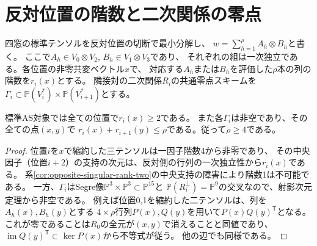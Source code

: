 \section{反対位置の階数と二次関係の零点}
\label{sec:opposite-evaluation}
四窓の標準テンソルを反対位置の切断で最小分解し、
$w=\sum_{h=1}^{\rho} A_h\otimes B_h$と書く。
ここで$A_h\in V_0\otimes V_2$, $B_h\in V_1\otimes V_3$であり、
それぞれの組は一次独立である。各位置の非零共変ベクトル$x$で、
対応する$A_h$または$B_h$を評価した$\rho$本の列の階数を$r_i(x)$とする。
隣接対の二次関係$R_i$の共通零点スキームを
$\Gamma_i\subset\mathbb P(V_i^*)\times\mathbb P(V_{i+1}^*)$とする。

\begin{theorem}[AS対象の第三階数は4以上]\label{thm:opposite-rank-at-least-four}
標準AS対象では全ての位置で$r_i(x)\ge2$である。
また各$\Gamma_i$は非空であり、その全ての点$(x,y)$で
$r_i(x)+r_{i+1}(y)\le\rho$である。従って$\rho\ge4$である。
\end{theorem}
\begin{proof}
位置$i$を$x$で縮約した三テンソルは一因子階数4から非零であり、
その中央因子（位置$i+2$）の支持の次元は、反対側の行列の一次独立性から$r_i(x)$である。
系\ref{cor:opposite-singular-rank-two}の中央支持の障害により階数1は不可能である。
一方、$\Gamma_i$はSegre像$\mathbb P^3\times\mathbb P^3\subset\mathbb P^{15}$と
$\mathbb P(R_i^\perp)=\mathbb P^9$の交叉なので、射影次元定理から非空である。
例えば位置0,1を縮約した二テンソルは、列を$A_h(x),B_h(y)$とする
$4\times\rho$行列$P(x),Q(y)$を用いて$P(x)Q(y)^{\mathsf T}$となる。
これが零であることは$R_0$の全元が$(x,y)$で消えることと同値であり、
$\operatorname{im} Q(y)^{\mathsf T}\subset\ker P(x)$から不等式が従う。
他の辺でも同様である。
\end{proof}

